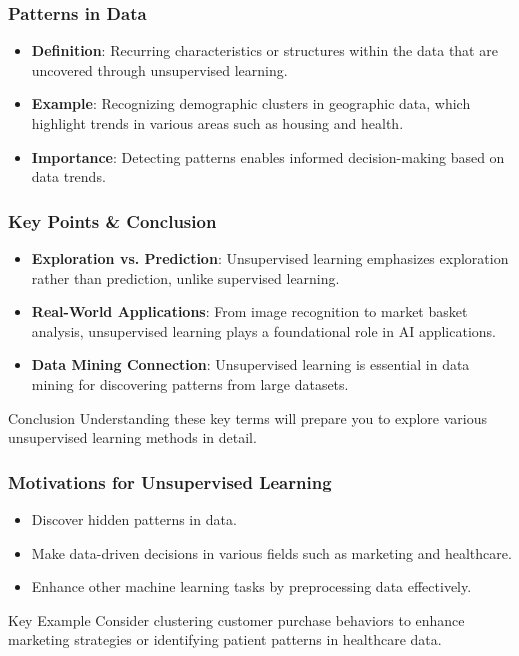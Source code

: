 \documentclass[aspectratio=169]{beamer}
\begin{document}
\begin{frame}[fragile]
    \frametitle{Patterns in Data}
    \begin{itemize}
        \item \textbf{Definition}:
            Recurring characteristics or structures within the data that are uncovered through unsupervised learning.
        \item \textbf{Example}:
            Recognizing demographic clusters in geographic data, which highlight trends in various areas such as housing and health.
        \item \textbf{Importance}:
            Detecting patterns enables informed decision-making based on data trends.
    \end{itemize}
\end{frame}

\begin{frame}[fragile]
    \frametitle{Key Points & Conclusion}
    \begin{itemize}
        \item \textbf{Exploration vs. Prediction}:
            Unsupervised learning emphasizes exploration rather than prediction, unlike supervised learning.
        \item \textbf{Real-World Applications}:
            From image recognition to market basket analysis, unsupervised learning plays a foundational role in AI applications.
        \item \textbf{Data Mining Connection}:
            Unsupervised learning is essential in data mining for discovering patterns from large datasets.
    \end{itemize}

    \begin{block}{Conclusion}
        Understanding these key terms will prepare you to explore various unsupervised learning methods in detail.
    \end{block}
\end{frame}

\begin{frame}[fragile]
    \frametitle{Motivations for Unsupervised Learning}
    \begin{itemize}
        \item Discover hidden patterns in data.
        \item Make data-driven decisions in various fields such as marketing and healthcare.
        \item Enhance other machine learning tasks by preprocessing data effectively.
    \end{itemize}
    \begin{block}{Key Example}
        Consider clustering customer purchase behaviors to enhance marketing strategies or identifying patient patterns in healthcare data.
    \end{block}
\end{frame}
\end{document}
